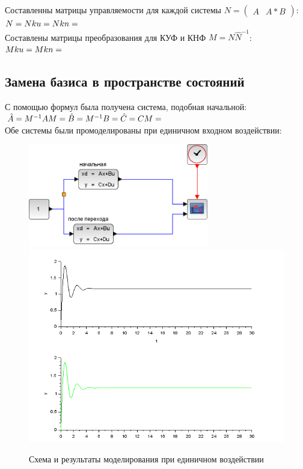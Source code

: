 \documentclass[a4paper,12pt,russian]{article} %
\begin{document}
Составленны матрицы управляемости для каждой системы $N=\begin{pmatrix}A & A*B\end{pmatrix}$:\\
$N=\\
Nku=\\
Nkn=$\\
Составлены матрицы преобразования для КУФ и КНФ $M=N \hat{N}^{-1}$:\\
$Mku=\\
Mkn=$\\

\subsection{Замена базиса в пространстве состояний}
С помощью формул была получена система, подобная начальной:\\
$\hat{A}=M^{-1}AM=\\
 \hat{B}=M^{-1}B=\\
 \hat{C}=CM=$\\ 
 Обе системы были промоделированы при единичном входном воздействии:\\

\begin{figure}[H]
	\includegraphics[width=0.7\textwidth]{change}
	\includegraphics[width=1\textwidth]{change-sim}
	\caption{Схема и результаты моделирования при единичном воздействии}
\end{figure}
\end{document}
